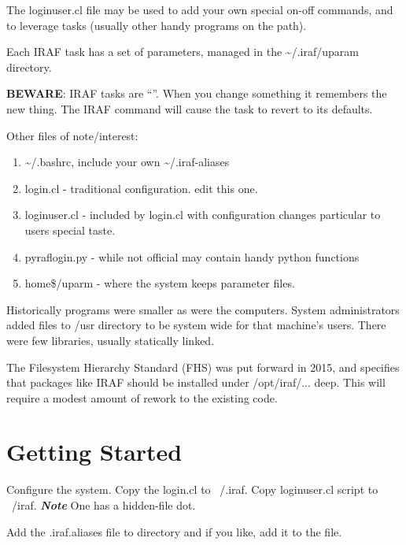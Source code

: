 The loginuser.cl file may be used to add your own special on-off commands,
and to leverage  tasks (usually other handy programs on the
path). 

Each IRAF task has a set of parameters, managed in the {\textasciitilde}/.iraf/uparam
directory. 

\textbf{BEWARE}: IRAF tasks are ``''. When you change something it remembers the new
thing. The IRAF command  will cause the task to revert to
its defaults. 

Other files of note/interest:

\vspace{-.15cm}
\begin{enumerate}\addtolength{\itemsep}{-0.5\baselineskip}
   \item  {\textasciitilde}/.bashrc, include your own {\textasciitilde}/.iraf-aliases
   \item  login.cl  - traditional configuration.  edit this one.
   \item  loginuser.cl - included by login.cl with configuration changes particular to
          users special taste.
   \item  pyraflogin.py - while not official may contain handy python functions
   \item  home\$/uparm - where the system keeps parameter files.
\end{enumerate}
Historically programs were smaller as were the computers. System
administrators added files to /usr directory to be system wide
for that machine's users. There were few libraries, usually statically
linked. 

The Filesystem Hierarchy Standard (FHS) was put forward in 2015, and
specifies that packages like IRAF should be installed under /opt/iraf/...
deep. This will require a modest amount of rework to the existing code.

\section{Getting Started}

Configure the system. Copy the login.cl to ~/.iraf. Copy loginuser.cl script
to ~/iraf. \textbf{\emph{Note}} One has a hidden-file dot.

Add the .iraf.aliases file to  directory and if you like, add it to
the  file.


